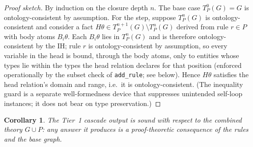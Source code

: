 \documentclass[11pt]{article}
\theoremstyle{plain}
\newtheorem{corollary}{Corollary}
\begin{document}
\begin{proof}[Proof sketch]
By induction on the closure depth $n$.  The base case $T_P^0(G) = G$
is ontology-consistent by assumption.  For the step, suppose
$T_P^n(G)$ is ontology-consistent and consider a fact
$H\theta \in T_P^{n+1}(G) \setminus T_P^n(G)$ derived from rule
$r \in P$ with body atoms $B_i\theta$.  Each $B_i\theta$ lies in
$T_P^n(G)$ and is therefore ontology-consistent by the IH; rule
$r$ is ontology-consistent by assumption, so every variable in the head
is bound, through the body atoms, only to entities whose types lie within
the types the head relation declares for that position (enforced
operationally by the subset check of \texttt{add\_rule}; see below).
Hence $H\theta$ satisfies the head relation's domain and range, i.e.\ it
is ontology-consistent.  (The inequality guard is a separate
well-formedness device that suppresses unintended self-loop instances; it
does not bear on type preservation.)
\end{proof}

\begin{corollary}
The Tier~1 cascade output is \emph{sound} with respect to the
combined theory $G \cup P$: any answer it produces is a proof-theoretic
consequence of the rules and the base graph.
\end{corollary}
\end{document}
